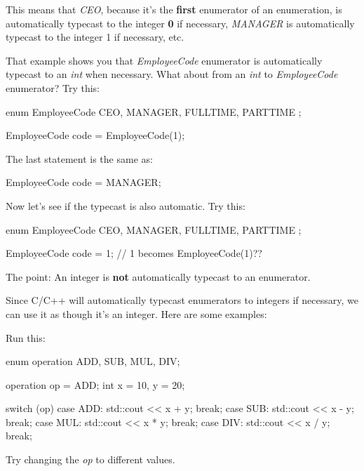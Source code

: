 This means that \textit{CEO}, because it's the
\textbf{first} enumerator of an enumeration, is automatically
typecast to the integer \textbf{0} if necessary, \textit{MANAGER}
is automatically typecast to the integer 1 if necessary, etc.

That example shows you that \textit{EmployeeCode} enumerator is
automatically typecast to an \textit{int} when necessary. What about from
an \textit{int} to \textit{EmployeeCode} enumerator? Try this:

\begin{consolethree}[escapeinside=||]
enum EmployeeCode
{
    CEO, MANAGER, FULLTIME, PARTTIME
};

EmployeeCode code = EmployeeCode(1);
\end{consolethree}

The last statement is the same as:

\begin{consolethree}[escapeinside=||]
EmployeeCode code = MANAGER;
\end{consolethree}

Now let's see if the typecast is also automatic. Try this:

\begin{consolethree}[escapeinside=||]
enum EmployeeCode
{
    CEO, MANAGER, FULLTIME, PARTTIME
};

EmployeeCode code = 1; // 1 becomes EmployeeCode(1)??
\end{consolethree}

The point: An integer is \textbf{not} automatically typecast to
an enumerator.

Since C/C++ will automatically typecast enumerators to integers if
necessary, we can use it as though it's an integer. Here
are some examples:

Run this:

\begin{consolethree}[escapeinside=||]
enum operation {ADD, SUB, MUL, DIV};

operation op = ADD;
int x = 10, y = 20;

switch (op)
{
    case ADD: std::cout << x + y; break;
    case SUB: std::cout << x - y; break;
    case MUL: std::cout << x * y; break;
    case DIV: std::cout << x / y; break;
}
\end{consolethree}

Try changing the \textit{op} to different values.



